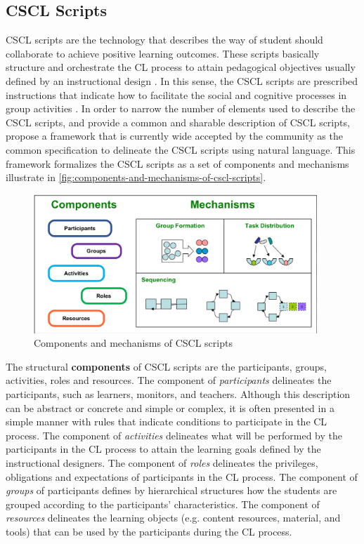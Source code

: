 \subsection{CSCL Scripts}
\label{sec:cscl-scripts}

CSCL scripts are the technology that describes the way of student should collaborate to achieve positive learning outcomes.
These scripts basically structure and orchestrate the CL process to attain pedagogical objectives usually defined by an instructional design \cite{DillenbourgJermann2007}.
In this sense, the CSCL scripts are prescribed instructions that indicate how to facilitate the social and cognitive processes in group activities \cite{Dillenbourg2002}.
In order to narrow the number of elements used to describe the CSCL scripts, and provide a common and sharable description of CSCL scripts,  propose a framework that is currently wide accepted by the community as the common specification to delineate the CSCL scripts using natural language.
This framework formalizes the CSCL scripts as a set of components and mechanisms illustrate in \autoref{fig:components-and-mechanisms-of-cscl-scripts}.


\begin{figure}[htb]
 \caption{Components and mechanisms of CSCL scripts}
 \label{fig:components-and-mechanisms-of-cscl-scripts}
 \centering
 \includegraphics[width=0.95\textwidth]{images/chap-general-background/components-and-mechanisms-of-cscl-scripts}
\end{figure}

The structural \textbf{components} of CSCL scripts are the participants, groups, activities, roles and resources.
The component of \emph{participants} delineates the participants, such as learners, monitors, and teachers. 
Although this description can be abstract or concrete and simple or complex, it is often presented in a simple manner with rules that indicate conditions to participate in the CL process.
The component of \emph{activities} delineates what will be performed by the participants in the CL process to attain the learning goals defined by the instructional designers.
The component of \emph{roles} delineates the privileges, obligations and expectations of participants in the CL process.
The component of \emph{groups} of participants defines by hierarchical structures how the students are grouped according to the participants' characteristics.
The component of \emph{resources} delineates the learning objects (e.g. content resources, material, and tools) that can be used by the participants during the CL process.

